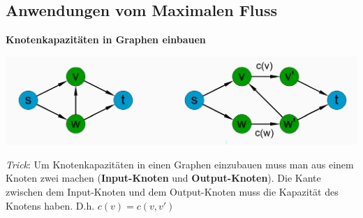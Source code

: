 \begin{sectionbox}
\subsection{Anwendungen vom Maximalen Fluss}\medskip

\textbf{Knotenkapazitäten in Graphen einbauen}\par
\includegraphics[width = \columnwidth]{../img/KontenKap.png}\par
\textit{Trick}: Um Knotenkapazitäten in einen Graphen einzubauen muss man aus einem Knoten zwei machen (\textbf{Input-Knoten} und \textbf{Output-Knoten}). Die Kante zwischen dem Input-Knoten und dem Output-Knoten muss die Kapazität des Knotens haben. D.h. $c(v) = c(v,v')$\par\smallskip
\end{sectionbox}